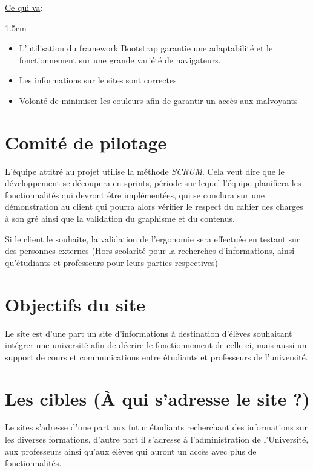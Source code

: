 \documentclass[oneside]{report}
\newcommand{\indentunder}{1.5cm}
\begin{document}
{	\par\underline{Ce qui va}:
		\vspace{.5cm}
		\begin{adjustwidth}{\indentunder}{}
		\begin{itemize}
			\item L'utilisation du framework Bootstrap garantie une adaptabilité et le fonctionnement sur une grande variété de navigateurs.
			\item Les informations sur le sites sont correctes
			\item Volonté de minimiser les couleurs afin de garantir un accès aux malvoyants
		\end{itemize}
		\end{adjustwidth}
	
		\section{Comité de pilotage}
		{
			\par L’équipe attitré au projet utilise la méthode \textit{SCRUM}. Cela veut dire que le développement se découpera en sprints, période sur lequel l’équipe planifiera les fonctionnalités qui devront être implémentées, qui se conclura sur une démonstration au client qui pourra alors vérifier le respect du cahier des charges à son gré ainsi que la validation du graphisme et du contenus.
			\vspace{.5cm}
			\par Si le client le souhaite, la validation de l’ergonomie sera effectuée en testant sur des personnes externes (Hors scolarité pour la recherches d’informations, ainsi qu’étudiants et professeurs pour leurs parties respectives)

		}
		\section{Objectifs du site}
		{
			Le site est d’une part un site d’informations à destination d’élèves souhaitant intégrer une université afin de décrire le fonctionnement de celle-ci, mais aussi un support de cours et communications entre étudiants et professeurs de l’université.
		}
		
		\section{Les cibles (À qui s'adresse le site ?)}
		\par Le sites s'adresse d'une part aux futur étudiants recherchant des informations sur les diverses formations, d'autre part il s'adresse à l'administration de l'Université, aux professeurs ainsi qu'aux élèves qui auront un accès avec plus de fonctionnalités.
}
\end{document}
